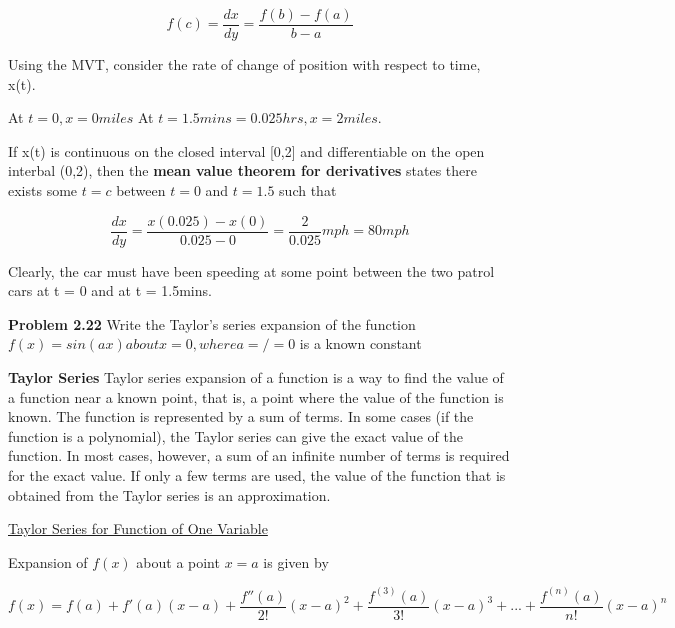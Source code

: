 \documentclass{article}
\begin{document}
\[f (c) = \frac{dx}{dy} = \frac{f(b) - f(a)}{b-a}\]



Using the MVT, consider the rate of change of position with respect to time, x(t). 

At $t=0, x = 0 miles$
At $t = 1.5mins = 0.025hrs, x = 2 miles$.

If x(t) is continuous on the closed interval [0,2] and differentiable on the open interbal (0,2), then the \textbf{mean value theorem for derivatives} states there exists some $t = c$ between $t = 0$ and $t = 1.5$ such that




\[\frac{dx}{dy} = \frac{x(0.025)-x(0)}{0.025-0} = \frac{2}{0.025}mph = 80mph  \]

Clearly, the car must have been speeding at some point between the two patrol cars at t = 0 and at t = 1.5mins.

\textbf{Problem 2.22}
Write the Taylor's series expansion of the function $f(x) = sin(ax) about x = 0, where a=/= 0$ is a 
known constant

\textbf{Taylor Series}
Taylor series expansion of a function is a way to find the value of a 
function near a known point, that is, a point where the value of the function is known. The function is represented by a sum of terms. In some cases (if the function is a polynomial), the Taylor series can give the exact value of the function. In most cases, however, a sum of an infinite number of terms is required for the exact value. If only a few terms are used, the value of the function that is obtained from the Taylor series is an approximation.

\underline{Taylor Series for Function of One Variable}

Expansion of $f(x)$ about a point $x = a$ is given by

\[f (x) = f(a) + f'(a)(x-a) + \frac{f ''(a)}{2!}(x-a)^2 + \frac{f ^{(3)}(a)}{3!}(x-a)^3 + ...+\frac{f ^{(n)}(a)}{n!}(x-a)^n \]
\end{document}
